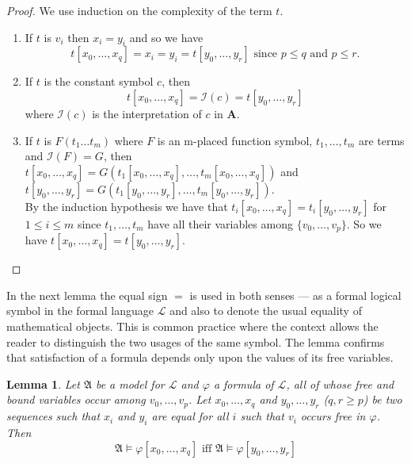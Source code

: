 \documentclass[titlepage, oneside]{amsbook}
\theoremstyle{plain}
\newtheorem{lemma}{Lemma}
\theoremstyle{definition}
\theoremstyle{remark}
\newcommand{\lan}{\ensuremath{\mathcal{L}}}
\newcommand{\ma}{\ensuremath{\mathfrak{A}}}
\newcommand{\ba}{\ensuremath{\mathbf{A}}}
\newcommand{\vnot}[2][0]{\ensuremath{ v_{#1} , \dots , v_{#2}}}
\newcommand{\xnot}[2][0]{\ensuremath{ x_{#1} , \dots , x_{#2}}}
\newcommand{\ynot}[2][0]{\ensuremath{ y_{#1} , \dots , y_{#2}}}
\newcommand{\amodphi}{\ensuremath{\mathfrak A \models \varphi}}
\begin{document}
\begin{proof} We use induction on the complexity of the term $t$.
\begin{enumerate}
\item If $t$ is $v_i$ then $x_i=y_i$ and so we have 
\[t[\xnot{q}]=x_i=y_i=t[\ynot{r}] \mbox{ since } p\leq q \mbox{ and } p 
\leq r. \]

\item If $t$ is the constant symbol $c$, then 
\[t[\xnot{q}] = \mathcal I (c) = t[\ynot{r}] \]
where $\mathcal I (c) $ is the interpretation of $c$ in $\ba$.

\item If $t$ is $F(t_{1} \dots t_{m})$ where $F$ is an m-placed  
function symbol,  $t_{1}, \dots ,t_{m}$ are terms and $\mathcal I (F) 
= G$, then \\
  $t[x_{0}, \dots 
, x_{q}]=G(t_{1}[x_{0}, \dots ,x_{q}], \dots , t_{m}[x_{0}, \dots
,x_{q}])$ and \\ 
$t[y_{0}, \dots
, y_{r}]=G(t_{1}[y_{0}, \dots ,y_{r}], \dots , t_{m}[y_{0}, \dots
,y_{r}])$. \\
By the induction hypothesis we have that $t_i [\xnot{q}] = t_i [
\ynot{r}] $  for $ 1
\leq i 
\leq m$  since $t_1, \dots , t_m$ have all their variables among $\{ 
\vnot{p} \} $. So  we have $t[ \xnot{q} ] = t [ \ynot{r} ] $.

\end{enumerate}
\end{proof}


In the next lemma the equal sign $=$ is used in both senses --- as a
formal logical symbol in the formal language $\lan$ and also to denote
the usual equality of mathematical objects.  This is common practice
where the context allows the reader to distinguish the two usages of
the same symbol. The lemma confirms that satisfaction of a formula
depends only upon the values of its free variables.



\begin{lemma}\label{L:sat}  Let $\ma$ be a model for $\lan$ and $\varphi$
a formula of
$\lan$, all of whose free and bound variables occur among $\vnot{p}$.
Let $\xnot{q}$ and $\ynot{r}$ ($q,r \geq p $) be two sequences such
that
$x_i$ and $y_i$  are equal for all $i$ such that $v_i$ occurs
free in $\varphi$. Then \[ \amodphi [ \xnot{q}] \mbox{ iff } \ma \models
\varphi [ \ynot{r} ] \]

\end{lemma}
\end{document}
